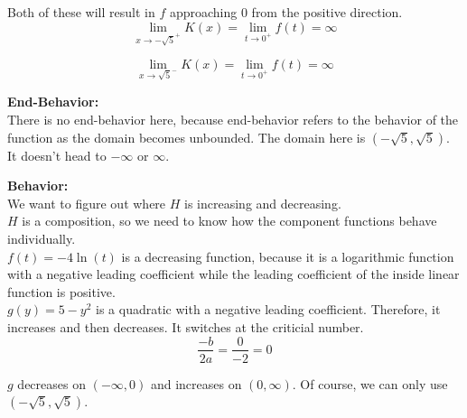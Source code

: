 \documentclass{ximera}
\begin{document}
Both of these will result in $f$ approaching $0$ from the positive direction. \\



\[
\lim\limits_{x \to -\sqrt{5}^+} K(x)  = \lim\limits_{t \to 0^+} f(t) = \infty
\]



\[
\lim\limits_{x \to \sqrt{5}^-} K(x)  = \lim\limits_{t \to 0^+} f(t) = \infty
\]
















\textbf{\textcolor{blue!55!black}{End-Behavior:}} \\

There is no end-behavior here, because end-behavior refers to the behavior of the function as the domain becomes unbounded.  The domain here is $(-\sqrt{5}, \sqrt{5})$. It doesn't head to $-\infty$ or $\infty$.











\textbf{\textcolor{blue!55!black}{Behavior:}} \\


We want to figure out where $H$ is increasing and decreasing. \\

$H$ is a composition, so we need to know how the component functions behave individually. \\





$f(t) = -4 \ln(t)$ is a decreasing function, because it is a logarithmic function with a negative leading coefficient while the leading coefficient of the inside linear function is  positive. \\

$g(y) = 5 - y^2$ is a quadratic with a negative leading coefficient.  Therefore, it increases and then decreases.   It switches at the criticial number.\\



\[
\frac{-b}{2 a} = \frac{0}{-2} = 0
\]


$g$ decreases on $(-\infty, 0)$ and increases on $(0, \infty)$.  Of course, we can only use $(-\sqrt{5}, \sqrt{5})$.
\end{document}
